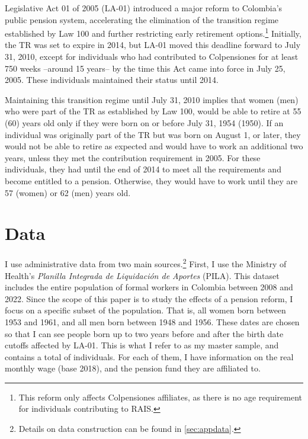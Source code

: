 \documentclass[12pt, a4paper]{article}
\begin{document}
Legislative Act 01 of 2005 (LA-01) introduced a major reform to Colombia’s public pension system, accelerating the elimination of the transition regime established by Law 100 and further restricting early retirement options.\footnote{This reform only affects Colpensiones affiliates, as there is no age requirement for individuals contributing to RAIS.} Initially, the TR was set to expire in 2014, but LA-01 moved this deadline forward to July 31, 2010, except for individuals who had contributed to Colpensiones for at least 750 weeks --around 15 years-- by the time this Act came into force in July 25, 2005. These individuals maintained their status until 2014.

Maintaining this transition regime until July 31, 2010 implies that women (men) who were part of the TR as established by Law 100, would be able to retire at 55 (60) years old only if they were born on or before July 31, 1954 (1950). If an individual was originally part of the TR but was born on August 1, or later, they would not be able to retire as expected and would have to work an additional two years, unless they met the contribution requirement in 2005. For these individuals, they had until the end of 2014 to meet all the requirements and become entitled to a pension. Otherwise, they would have to work until they are 57 (women) or 62 (men) years old.




\section{Data \label{sec:data}}

I use administrative data from two main sources.\footnote{Details on data construction can be found in \autoref{sec:appdata}.} First, I use the Ministry of Health's \textit{Planilla Integrada de Liquidación de Aportes} (PILA). This dataset includes the entire population of formal workers in Colombia between 2008 and 2022. Since the scope of this paper is to study the effects of a pension reform, I focus on a specific subset of the population. That is, all women born between 1953 and 1961, and all men born between 1948 and 1956. These dates are chosen so that I can see people born up to two years before and after the birth date cutoffs affected by LA-01. This is what I refer to as my master sample, and contains a total of  individuals. For each of them, I have information on the real monthly wage (base 2018), and the pension fund they are affiliated to.
\end{document}
